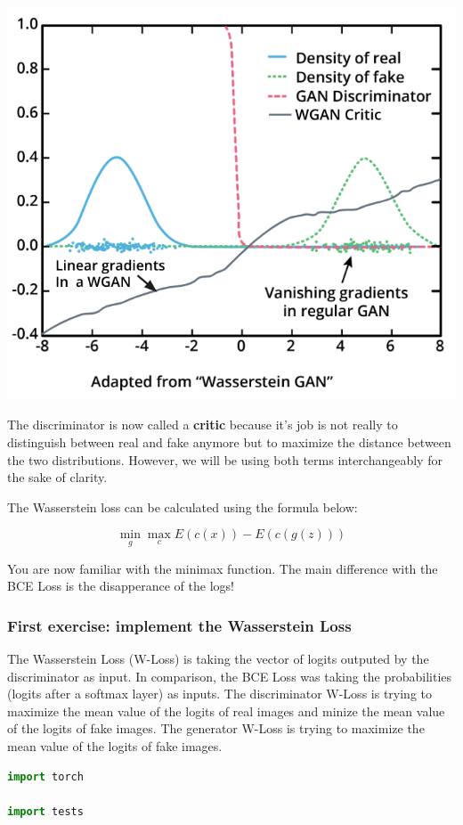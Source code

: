 \includegraphics[width=0.75\linewidth]{img//genAdvNet//modernGAN/gradient_replace.png}

The discriminator is now called a \textbf{critic} because it's job is
not really to distinguish between real and fake anymore but to maximize
the distance between the two distributions. However, we will be using
both terms interchangeably for the sake of clarity. \newline

The Wasserstein loss can be calculated using the formula below:

\[\min_{g} \max_{c} E(c(x)) - E(c(g(z)))\]

You are now familiar with the minimax function. The main difference with
the BCE Loss is the disapperance of the logs!

\subsubsection{First exercise: implement the Wasserstein Loss}

The Wasserstein Loss (W-Loss) is taking the vector of logits outputed by
the discriminator as input. In comparison, the BCE Loss was taking the
probabilities (logits after a softmax layer) as inputs. The
discriminator W-Loss is trying to maximize the mean value of the logits
of real images and minize the mean value of the logits of fake images.
The generator W-Loss is trying to maximize the mean value of the logits
of fake images.

\begin{lstlisting}[language=Python]
import torch

import tests
\end{lstlisting}

